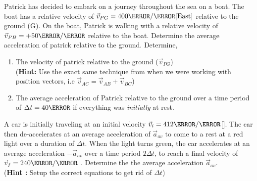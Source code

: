 \documentclass[12pt]{article} %
\newcommand{\tx}[1]{\text{#1}}
\begin{document}
 \begin{qstn}[7]
    Patrick has decided to embark on a journey throughout the sea on a boat. The boat has a relative velocity of $\vec v_{PG} = 400 \m / \s\tx{[East]}$ relative to the ground (G). On the boat, Patrick is walking with a relative velocity of $\vec v_{PB} = +50 \m / \s$ relative to the boat. Determine the average acceleration of patrick relative to the ground. Determine,
    \begin{enumerate}[label = (\alph*)]
        \item The velocity of patrick relative to the ground ($\vec v_{PG}$)\\
        (\textbf{Hint: }Use the exact same technique from when we were working with position vectors, i.e $\vec v_{AC} = \vec v_{AB} + \vec v_{BC}$)
        \item The average acceleration of Patrick relative to the ground over a time period of $\Delta t = 40\s$ if everything was \emph{initially} at rest.

    \end{enumerate}

 \end{qstn}




\begin{qstn}[8]
    A car is initially traveling at an initial velocity $\vec v_i = 412 \m / \s$[\tx{East}]. The car then de-accelerates at an average acceleration of $\vec a_{av}$ to come to a rest at a red light over a duration of $\Delta t$. When the light turns green, the car accelerates at an average acceleration $-\vec a_{av}$ over a time period $2\Delta t$, to reach a final velocity of $\vec v_f = 240 \m / \s$ \tx{[East]} . Determine the the average acceleration $\vec a_{av}$. \\(\textbf{Hint :} Setup the correct equations to get rid of $\Delta t$) 
 \end{qstn}
\end{document}
